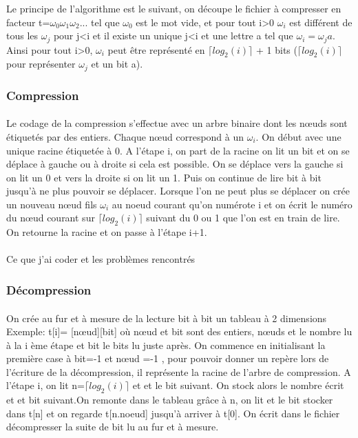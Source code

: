 \documentclass{report}
\begin{document}
Le principe de l'algorithme est le suivant, on découpe le fichier à compresser en facteur t=$ \omega_{0}\omega_{1}\omega_{2}$... tel que $\omega_{0}$ est le mot vide, et pour tout i>0 $\omega_{i}$ est différent de tous les $\omega_{j}$ pour j<i et il existe un unique j<i et une lettre a tel que $\omega_{i}=\omega_{j}a$. 
Ainsi pour tout i>0, $\omega_{i}$ peut être représenté en $\lceil log_{2}(i) \rceil$ + 1 bits ($\lceil log_{2}(i) \rceil$ pour représenter $\omega_{j}$ et un bit a).

\subsubsection{Compression}
\paragraph*{}
Le codage de la compression s'effectue avec un arbre binaire dont les nœuds sont étiquetés par des entiers. Chaque nœud correspond à un $\omega_{i}$. On début avec une unique racine étiquetée à 0.
A l'étape i, on part de la racine on lit un bit et on se déplace à gauche ou à droite si cela est possible. On se déplace vers la gauche si on lit un 0 et vers la droite si on lit un 1. Puis on continue de lire bit à bit jusqu'à ne plus pouvoir se déplacer. Lorsque l'on ne peut plus se déplacer on crée un nouveau nœud fils $\omega_{i}$ au noeud courant qu'on numérote i et on écrit le numéro du nœud courant sur $\lceil log_{2}(i) \rceil$ suivant du 0 ou 1 que l'on est en train de lire.
On retourne la racine et on passe à l'étape i+1.
\paragraph*{}
 Ce que j'ai coder et les problèmes rencontrés

\subsubsection{Décompression}
\paragraph*{}
On crée au fur et à mesure de la lecture bit à bit un tableau à 2 dimensions Exemple: t[i]= [nœud][bit] où nœud et bit sont des entiers, nœuds et le nombre lu à la i ème étape et bit le bits lu juste après. 
On commence en initialisant la première case à  bit=-1 et nœud =-1 , pour pouvoir donner un repère lors de l'écriture de la décompression, il représente la racine de l'arbre de compression.  
A l'étape i, on lit n=$\lceil log_{2}(i) \rceil$ et et le bit suivant. On stock alors le nombre écrit et et bit suivant.On remonte dans le tableau grâce à n, on lit et le bit stocker dans t[n] et on regarde t[n.noeud] jusqu'à arriver à t[0]. On écrit dans le fichier décompresser la suite de bit lu au fur et à mesure.
\end{document}

